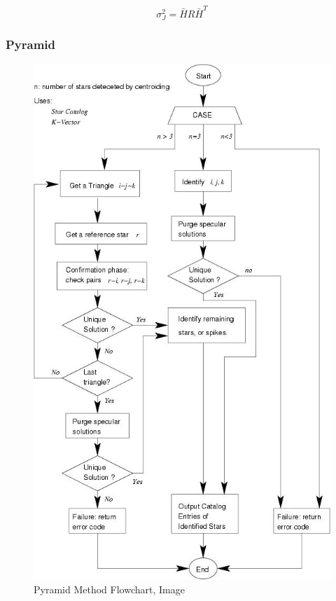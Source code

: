 \documentclass[12pt,a4paper,oneside]{article}
\begin{document}
\begin{equation}
\sigma_J^2 = \bar{H}R\bar{H}^T
\end{equation}

\subsubsection{Pyramid}

\begin{figure}[ht]
\includegraphics[scale=0.57]{pyramid_method.jpg}
\centering
\caption{Pyramid Method Flowchart, Image \citet{mortari2004pyramid}}
\label{fig:pyramid_method}
\end{figure}
\end{document}
